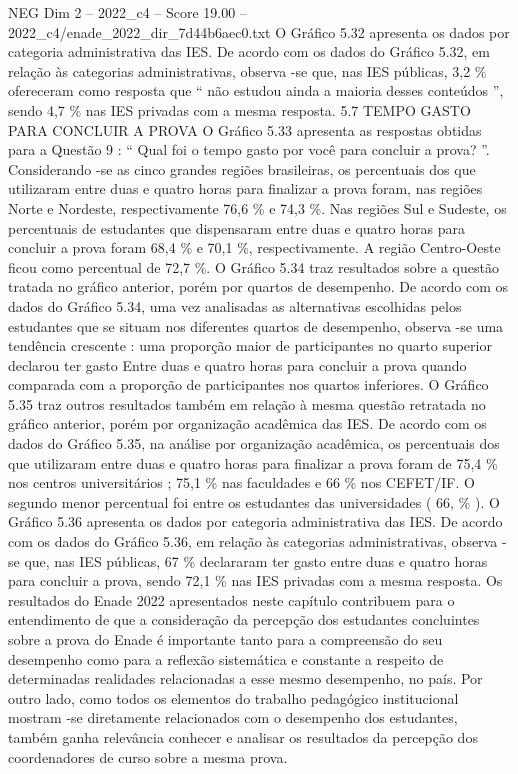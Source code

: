 \begin{textsample}{NEG Dim 2 – 2022\_c4 – Score 19.00 – 2022\_c4/enade\_2022\_dir\_7d44b6aec0.txt}
O Gráfico 5.32 apresenta os dados por categoria administrativa das IES.
De acordo com os dados do Gráfico 5.32, em relação às categorias administrativas, observa -se que, nas IES públicas, 3,2 \% ofereceram como resposta que “ não estudou ainda a maioria desses conteúdos ”, sendo 4,7 \% nas IES privadas com a mesma resposta. 5.7 TEMPO GASTO PARA CONCLUIR A PROVA O Gráfico 5.33 apresenta as respostas obtidas para a Questão 9 : “ Qual foi o tempo gasto por você para concluir a prova? ”.
Considerando -se as cinco grandes regiões brasileiras, os percentuais dos que utilizaram entre duas e quatro horas para finalizar a prova foram, nas regiões Norte e Nordeste, respectivamente 76,6 \% e 74,3 \%.
Nas regiões Sul e Sudeste, os percentuais de estudantes que dispensaram entre duas e quatro horas para concluir a prova foram 68,4 \% e 70,1 \%, respectivamente.
A região Centro-Oeste ficou como percentual de 72,7 \%.
O Gráfico 5.34 traz resultados sobre a questão tratada no gráfico anterior, porém por quartos de desempenho.
De acordo com os dados do Gráfico 5.34, uma vez analisadas as alternativas escolhidas pelos estudantes que se situam nos diferentes quartos de desempenho, observa -se uma tendência crescente : uma proporção maior de participantes no quarto superior declarou ter gasto Entre duas e quatro horas para concluir a prova quando comparada com a proporção de participantes nos quartos inferiores.
O Gráfico 5.35 traz outros resultados também em relação à mesma questão retratada no gráfico anterior, porém por organização acadêmica das IES.
De acordo com os dados do Gráfico 5.35, na análise por organização acadêmica, os percentuais dos que utilizaram entre duas e quatro horas para finalizar a prova foram de 75,4 \% nos centros universitários ; 75,1 \% nas faculdades e 66 \% nos CEFET/IF.
O segundo menor percentual foi entre os estudantes das universidades ( 66, \% ).
O Gráfico 5.36 apresenta os dados por categoria administrativa das IES.
De acordo com os dados do Gráfico 5.36, em relação às categorias administrativas, observa -se que, nas IES públicas, 67 \% declararam ter gasto entre duas e quatro horas para concluir a prova, sendo 72,1 \% nas IES privadas com a mesma resposta.
Os resultados do Enade 2022 apresentados neste capítulo contribuem para o entendimento de que a consideração da percepção dos estudantes concluintes sobre a prova do Enade é importante tanto para a compreensão do seu desempenho como para a reflexão sistemática e constante a respeito de determinadas realidades relacionadas a esse mesmo desempenho, no país.
Por outro lado, como todos os elementos do trabalho pedagógico institucional mostram -se diretamente relacionados com o desempenho dos estudantes, também ganha relevância conhecer e analisar os resultados da percepção dos coordenadores de curso sobre a mesma prova.

\end{textsample}
